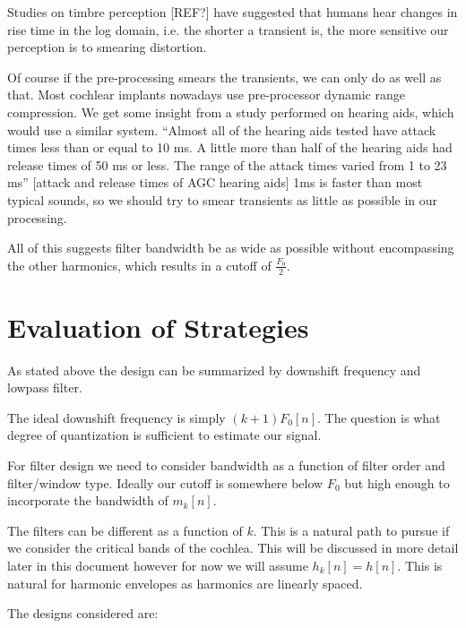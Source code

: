 \documentclass [11pt, proquest,oneside] {ganter_thesis}[2015/03/03]
\begin{document}
Studies on timbre perception [REF?] have suggested that humans hear changes in rise time in the log domain, i.e. the shorter a transient is, the more sensitive our perception is to smearing distortion.

Of course if the pre-processing smears the transients, we can only do as well as that.  Most cochlear implants nowadays use pre-processor dynamic range compression.  We get some insight from a study performed on hearing aids, which would use a similar system.  ``Almost all of the hearing aids tested have attack times less than or equal to 10 ms. A little more than half of the hearing aids had release times of 50 ms or less.  The range of the attack times varied from 1 to 23 ms'' [attack and release times of AGC hearing aids]  1ms is faster than most typical sounds, so we should try to smear transients as little as possible in our processing.

All of this suggests filter bandwidth be as wide as possible without encompassing the other harmonics, which results in a cutoff of $\frac{F_0}{2}$.



\section{Evaluation of Strategies}

As stated above the design can be summarized by downshift frequency and lowpass filter.

The ideal downshift frequency is simply $(k+1)F_0[n]$.  The question is what degree of quantization is sufficient to estimate our signal.

For filter design we need to consider bandwidth as a function of filter order and filter/window type.  Ideally our cutoff is somewhere below $F_0$ but high enough to incorporate the bandwidth of $m_k[n]$.

The filters can be different as a function of $k$.  This is a natural path to pursue if we consider the critical bands of the cochlea.  This will be discussed in more detail later in this document however for now we will assume $h_k[n] = h[n]$.  This is natural for harmonic envelopes as harmonics are linearly spaced.

The designs considered are:
\end{document}
